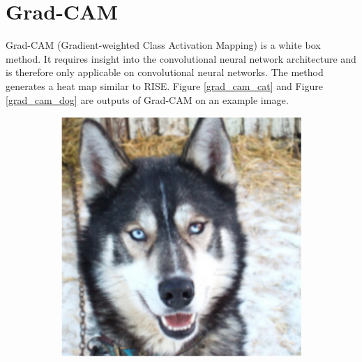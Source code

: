 \section{Grad-CAM}
Grad-CAM \cite{selvaraju2017grad} (Gradient-weighted Class Activation Mapping) is a white box method. It requires insight into the convolutional neural network architecture and is therefore only applicable on convolutional neural networks. The method generates a heat map similar to RISE. Figure \ref{grad_cam_cat} and Figure \ref{grad_cam_dog} are outputs of Grad-CAM on an example image.
\captionsetup[figure]{font=Large,labelfont=Large}
\begin{figure}[H]
    \centering
    \begin{subfigure}{.5\textwidth}
        \centering
        \includegraphics[width=0.95\linewidth]{images/wolf.png}
        \caption{}
    \end{subfigure}%
    \begin{subfigure}{.5\textwidth}
        \centering

\end{subfigure}
\end{figure}
